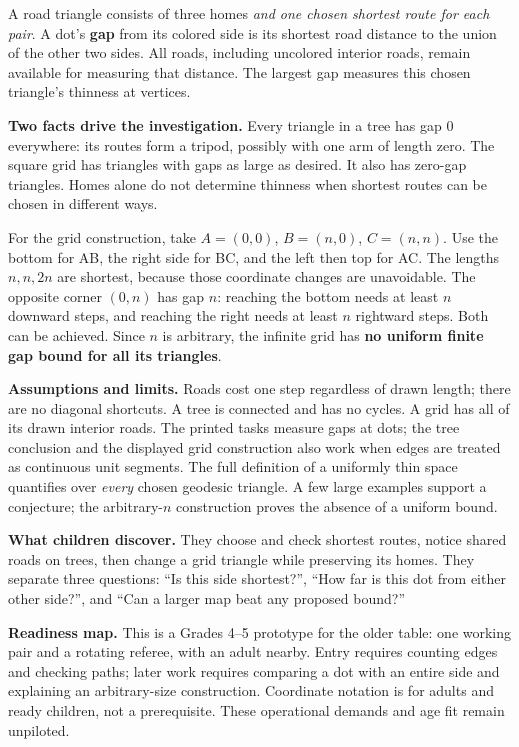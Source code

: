 \documentclass[11pt,letterpaper]{article}
\newcommand{\heading}[1]{\par\vspace{5pt}{\large\bfseries #1}\par}
\begin{document}
\heading{Mathematical destination}
A road triangle consists of three homes \emph{and one chosen shortest route for each pair}. A dot's \textbf{gap} from its colored side is its shortest road distance to the union of the other two sides. All roads, including uncolored interior roads, remain available for measuring that distance. The largest gap measures this chosen triangle's thinness at vertices.

\textbf{Two facts drive the investigation.} Every triangle in a tree has gap 0 everywhere: its routes form a tripod, possibly with one arm of length zero. The square grid has triangles with gaps as large as desired. It also has zero-gap triangles. Homes alone do not determine thinness when shortest routes can be chosen in different ways.

For the grid construction, take $A=(0,0)$, $B=(n,0)$, $C=(n,n)$. Use the bottom for AB, the right side for BC, and the left then top for AC. The lengths $n,n,2n$ are shortest, because those coordinate changes are unavoidable. The opposite corner $(0,n)$ has gap \textbf{$n$}: reaching the bottom needs at least $n$ downward steps, and reaching the right needs at least $n$ rightward steps. Both can be achieved. Since $n$ is arbitrary, the infinite grid has \textbf{no uniform finite gap bound for all its triangles}.

\textbf{Assumptions and limits.} Roads cost one step regardless of drawn length; there are no diagonal shortcuts. A tree is connected and has no cycles. A grid has all of its drawn interior roads. The printed tasks measure gaps at dots; the tree conclusion and the displayed grid construction also work when edges are treated as continuous unit segments. The full definition of a uniformly thin space quantifies over \emph{every} chosen geodesic triangle. A few large examples support a conjecture; the arbitrary-$n$ construction proves the absence of a uniform bound.

\textbf{What children discover.} They choose and check shortest routes, notice shared roads on trees, then change a grid triangle while preserving its homes. They separate three questions: ``Is this side shortest?'', ``How far is this dot from either other side?'', and ``Can a larger map beat any proposed bound?''

\textbf{Readiness map.} This is a Grades 4--5 prototype for the older table: one working pair and a rotating referee, with an adult nearby. Entry requires counting edges and checking paths; later work requires comparing a dot with an entire side and explaining an arbitrary-size construction. Coordinate notation is for adults and ready children, not a prerequisite. These operational demands and age fit remain unpiloted.
\end{document}

